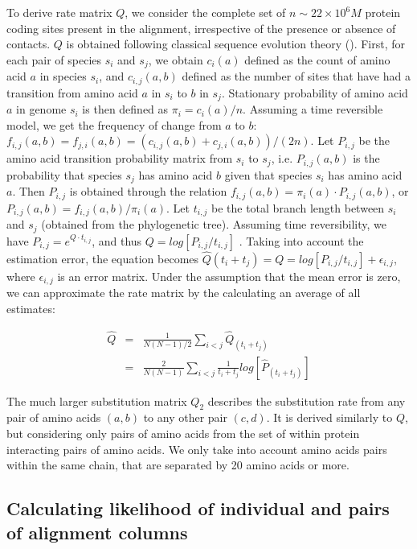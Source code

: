 To derive rate matrix $Q$, we consider the complete set of $n \sim 22 \times 10^6M$ protein coding sites present in the alignment, irrespective of the presence or absence of contacts. $Q$ is obtained following classical sequence evolution theory (\cite{yang2006computational, felsenstein2004inferring}). First, for each pair of species  $s_i$ and $s_j$, we obtain $c_i(a)$ defined as the count of amino acid $a$ in species $s_i$, and $c_{i,j}(a,b)$ defined as the number of sites that have had a transition from amino acid $a$ in $s_i$ to $b$ in $s_j$. Stationary probability of amino acid $a$ in genome $s_i$ is then defined as $\pi_i = c_i(a)/n$. Assuming a time reversible model, we get the frequency of change from $a$ to $b$: $f_{i,j}(a,b) = f_{j,i}(a,b) = (c_{i,j}(a,b) + c_{j,i}(a,b))/(2n)$. Let $P_{i,j}$ be the amino acid transition probability matrix from $s_i$ to $s_j$, i.e. $P_{i,j}(a,b)$ is the probability that species $s_j$ has amino acid $b$ given that species $s_i$ has amino acid $a$. Then $P_{i,j}$ is obtained through the relation $f_{i,j}(a,b) = \pi_i(a) \cdot P_{i,j}(a,b)$, or $P_{i,j}(a,b) =   f_{i,j}(a,b) /  \pi_i(a)$.  Let $t_{i,j}$ be the total branch length between $s_i$ and $s_j$ (obtained from the phylogenetic tree). Assuming time reversibility, we have $P_{i,j} = e^{Q \cdot t_{i,j}}$, and thus $Q=log[ P_{i,j} / t_{i,j} ]$ \cite{yang2006computational}. Taking into account the estimation error, the equation becomes $\hat{Q}(t_i+t_j) = Q = log[ P_{i,j} / t_{i,j} ] + \epsilon_{i,j}$, where $\epsilon_{i,j}$ is an error matrix. Under the assumption that the mean error is zero, we can approximate the rate matrix by the calculating an average of all estimates:

\begin{eqnarray*}
	\hat{Q} & = & \frac{1}{N(N-1)/2} \sum_{i < j} \hat{Q}_(t_i+t_j) \\
	            & =  & \frac{2}{N(N-1)} \sum_{i<j} \frac{1}{t_i+t_j} log[ \hat{P}_(t_i+t_j) ]
\end{eqnarray*}

The much larger substitution matrix $Q_2$ describes the substitution rate from any pair of amino acids $(a,b)$ to any other pair $(c,d)$. It is derived similarly to $Q$, but considering only pairs of amino acids from the set of within protein interacting pairs of amino acids. We only take into account amino acids pairs within the same chain, that are separated by 20 amino acids or more. 

\subsection{Calculating likelihood of individual and pairs of alignment columns}

